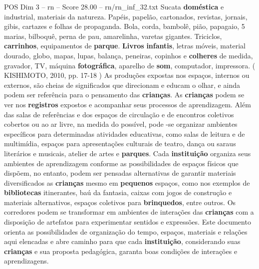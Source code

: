 \begin{textsample}{POS Dim 3 – rn – Score 28.00 – rn/rn\_inf\_32.txt}
Sucata \textbf{doméstica} e industrial, materiais da natureza.
Papéis, papelão, cartonados, revistas, jornais, gibis, cartazes e folhas de propaganda.
Bola, corda, bambolê, pião, papagaio, 5 marias, bilboquê, perna de pau, amarelinha, varetas gigantes.
Triciclos, \textbf{carrinhos}, equipamentos de \textbf{parque}. \textbf{Livros} \textbf{infantis}, letras móveis, material dourado, globo, mapas, lupas, balança, peneiras, copinhos e \textbf{colheres} de medida, gravador, TV, máquina \textbf{fotográfica}, aparelho de \textbf{som}, computador, impressora. ( KISHIMOTO, 2010, pp. 17-18 ) As produções expostas nos espaços, internos ou externos, são cheias de significados que direcionam e educam o olhar, e ainda podem ser referência para o pensamento das \textbf{crianças}.
As \textbf{crianças} podem se ver nos \textbf{registros} expostos e acompanhar seus processos de aprendizagem.
Além das salas de referências e dos espaços de circulação e de encontros coletivos cobertos ou ao ar livre, na medida do possível, pode -se organizar ambientes específicos para determinadas atividades educativas, como salas de leitura e de multimídia, espaços para apresentações culturais de teatro, dança ou saraus literários e musicais, atelier de artes e \textbf{parques}.
Cada \textbf{instituição} organiza seus ambientes de aprendizagem conforme as possibilidades de espaços físicos que dispõem, no entanto, podem ser pensadas alternativas de garantir materiais diversificados as \textbf{crianças} mesmo em \textbf{pequenos} espaços, como nos exemplos de \textbf{bibliotecas} itinerantes, baú da fantasia, caixas com jogos de construção e materiais alternativos, espaços coletivos para \textbf{brinquedos}, entre outros.
Os corredores podem se transformar em ambientes de interações das \textbf{crianças} com a disposição de artefatos para experimentar sentidos e expressões.
Este documento orienta as possibilidades de organização do tempo, espaços, materiais e relações aqui elencadas e abre caminho para que cada \textbf{instituição}, considerando suas \textbf{crianças} e sua proposta pedagógica, garanta boas condições de interações e aprendizagens.

\end{textsample}
